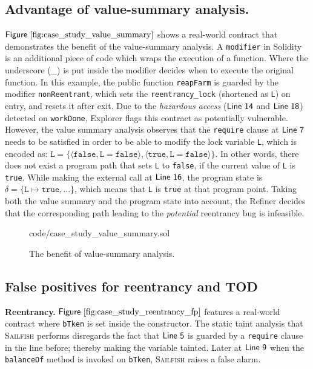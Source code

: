 \documentclass[conference, romanappendices]{tex/IEEEtran}
\theoremstyle{bfnote}
\newcommand{\toolname}{\textsc{Sailfish}\xspace}
\newcommand{\explorer}{{\sc Explorer}\xspace}
\newcommand{\refiner}{{\sc Refiner}\xspace}
\newcommand{\solidity}{{\sc Solidity}\xspace}
\newcommand{\reentrancy}{{reentrancy}\xspace}
\newcommand{\vsa}{{value-summary analysis}\xspace}
\newcommand{\Line}[1]{\ensuremath{\sf Line~ #1}}
\newcommand{\Fig}[1]{\ensuremath{\sf Figure~\ref{#1}}}
\newcommand{\valEnv}{\delta}
\begin{document}
\subsection{Advantage of \vsa.}
\label{app:vsa_advantage}
\Fig{fig:case_study_value_summary} shows a real-world contract that demonstrates the benefit of the \vsa.
A \texttt{modifier} in \solidity{} is an additional piece of code which wraps the execution of a function.
Where the underscore (\_) is put inside the modifier decides when to execute the original function.
In this example, the public function \texttt{reapFarm} is guarded by the modifier \texttt{nonReentrant}, which sets the \texttt{reentrancy\_lock} ({shortened\EndAccSupp{}} as \texttt{L}) on entry, and resets it after exit.
Due to the \textit{hazardous access} (\Line{14} and \Line{18}) detected on \texttt{workDone}, \explorer flags this contract as potentially vulnerable.
However, the value summary analysis observes that the \texttt{require} clause at \Line{7} needs to be satisfied in order to be able to modify the lock variable \texttt{L}, which is encoded as: $\texttt{L} = \{\langle \mathtt{false},\mathtt{L=false} \rangle, \langle  \mathtt{true},\mathtt{L=false}  \rangle\}$.
In other words, there does not exist a program path that sets \texttt{L} to \texttt{false}, if the current value of \texttt{L} is \texttt{true}.
While making the external call at \Line{16}, the program state is $\valEnv=\{\mathtt{L}\mapsto \mathtt{true},...\}$, which means that \texttt{L} is \texttt{true} at that program point.
Taking both the value summary and the program state into account, the \refiner{} decides that the corresponding path leading to the \textit{potential} \reentrancy bug is infeasible.

\begin{figure}[t]
	
	{code/case_study_value_summary.sol}
	\vspace{-5mm}
	\caption{The benefit of \vsa.
	}
	\label{fig:case_study_value_summary}
\end{figure}

\subsection{False positives for \reentrancy and TOD}
\label{sec:case_study_reent_fp}
\noindent
\textbf{Reentrancy.} \Fig{fig:case_study_reentrancy_fp} features a real-world contract where \texttt{bTken} is set inside the constructor.
The static taint analysis that \toolname{} performs disregards the fact that \Line{5} is guarded by a \texttt{require} clause in the line before; thereby making the variable tainted.
Later at \Line{9} when the \texttt{balanceOf} method is invoked on \texttt{bTken}, \toolname raises a false alarm.
\end{document}
